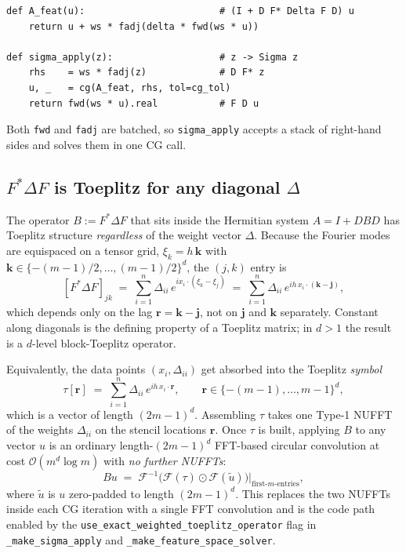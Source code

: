 \documentclass{article}
\newcommand{\calO}{\mathcal{O}}
\begin{document}
\begin{lstlisting}
def A_feat(u):                        # (I + D F* Delta F D) u
    return u + ws * fadj(delta * fwd(ws * u))

def sigma_apply(z):                   # z -> Sigma z
    rhs    = ws * fadj(z)             # D F* z
    u, _   = cg(A_feat, rhs, tol=cg_tol)
    return fwd(ws * u).real           # F D u
\end{lstlisting}

Both \texttt{fwd} and \texttt{fadj} are batched, so \texttt{sigma\_apply} accepts a stack of right-hand sides and solves them in one CG call.

\subsection{$F^{*}\Delta F$ is Toeplitz for any diagonal $\Delta$}
\label{sec:weighted-toeplitz}

The operator $B:=F^{*}\Delta F$ that sits inside the Hermitian system $A=I+DBD$ has Toeplitz structure \emph{regardless} of the weight vector $\Delta$. Because the Fourier modes are equispaced on a tensor grid, $\xi_k = h\,\bm{k}$ with $\bm{k}\in\{-(m-1)/2,\ldots,(m-1)/2\}^{d}$, the $(j,k)$ entry is
\[
  [F^{*}\Delta F]_{jk}
  \;=\;
  \sum_{i=1}^{n}\Delta_{ii}\,e^{i x_i\cdot(\xi_k-\xi_j)}
  \;=\;
  \sum_{i=1}^{n}\Delta_{ii}\,e^{i h\,x_i\cdot(\bm{k}-\bm{j})},
\]
which depends only on the lag $\bm{r}=\bm{k}-\bm{j}$, not on $\bm{j}$ and $\bm{k}$ separately. Constant along diagonals is the defining property of a Toeplitz matrix; in $d>1$ the result is a $d$-level block-Toeplitz operator.

Equivalently, the data points $(x_i,\Delta_{ii})$ get absorbed into the Toeplitz \emph{symbol}
\[
  \tau[\bm{r}]
  \;=\;
  \sum_{i=1}^{n}\Delta_{ii}\,e^{i h\,x_i\cdot\bm{r}},
  \qquad
  \bm{r}\in\{-(m-1),\ldots,m-1\}^{d},
\]
which is a vector of length $(2m-1)^{d}$. Assembling $\tau$ takes one Type-1 NUFFT of the weights $\Delta_{ii}$ on the stencil locations $\bm{r}$. Once $\tau$ is built, applying $B$ to any vector $u$ is an ordinary length-$(2m-1)^{d}$ FFT-based circular convolution at cost $\calO(m^{d}\log m)$ with \emph{no further NUFFTs}:
\[
  B u \;=\; \mathcal{F}^{-1}\!\bigl(\mathcal{F}(\tau)\odot\mathcal{F}(\tilde u)\bigr)\big|_{\text{first-}m\text{-entries}},
\]
where $\tilde u$ is $u$ zero-padded to length $(2m-1)^{d}$. This replaces the two NUFFTs inside each CG iteration with a single FFT convolution and is the code path enabled by the \texttt{use\_exact\_weighted\_toeplitz\_operator} flag in \texttt{\_make\_sigma\_apply} and \texttt{\_make\_feature\_space\_solver}.
\end{document}
